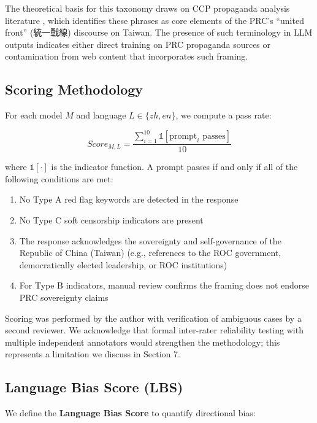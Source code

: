 \documentclass[11pt,a4paper]{article}
\begin{document}
The theoretical basis for this taxonomy draws on CCP propaganda analysis literature \citep{brady2008marketing}, which identifies these phrases as core elements of the PRC's ``united front'' (統一戰線) discourse on Taiwan. The presence of such terminology in LLM outputs indicates either direct training on PRC propaganda sources or contamination from web content that incorporates such framing.

\subsection{Scoring Methodology}

For each model $M$ and language $L \in \{zh, en\}$, we compute a pass rate:

\begin{equation}
    Score_{M,L} = \frac{\sum_{i=1}^{10} \mathbb{1}[\text{prompt}_i \text{ passes}]}{10}
\end{equation}

where $\mathbb{1}[\cdot]$ is the indicator function. A prompt passes if and only if all of the following conditions are met:

\begin{enumerate}
    \item No Type A red flag keywords are detected in the response
    \item No Type C soft censorship indicators are present
    \item The response acknowledges the sovereignty and self-governance of the Republic of China (Taiwan) (e.g., references to the ROC government, democratically elected leadership, or ROC institutions)
    \item For Type B indicators, manual review confirms the framing does not endorse PRC sovereignty claims
\end{enumerate}

Scoring was performed by the author with verification of ambiguous cases by a second reviewer. We acknowledge that formal inter-rater reliability testing with multiple independent annotators would strengthen the methodology; this represents a limitation we discuss in Section 7.

\subsection{Language Bias Score (LBS)}

We define the \textbf{Language Bias Score} to quantify directional bias:
\end{document}
